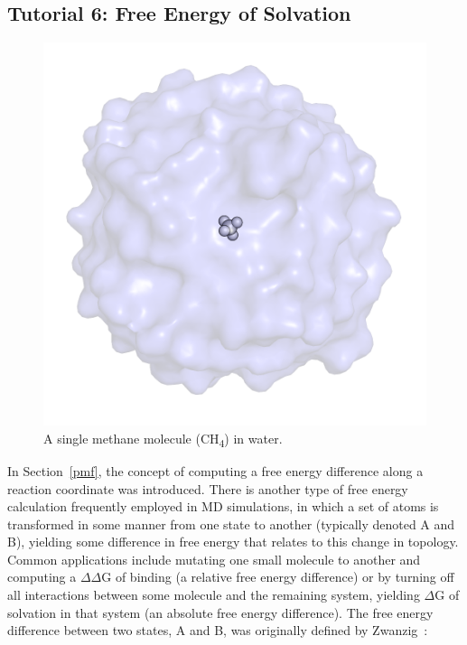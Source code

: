 \documentclass[9pt,tutorial]{livecoms}
\begin{document}
\subsection{Tutorial 6: Free Energy of Solvation} \label{fes}

\begin{figure}[H]
\centering
\includegraphics{free_energy_methane_water}
\caption{A single methane molecule (CH\textsubscript{4}) in water.}
\label{free_energy_methane_water_fig}
\end{figure}

In Section~\ref{pmf}, the concept of computing a free energy difference along a reaction coordinate was introduced. There is another type of free energy calculation frequently employed in MD simulations, in which a set of atoms is transformed in some manner from one state to another (typically denoted A and B), yielding some difference in free energy that relates to this change in topology. Common applications include mutating one small molecule to another and computing a $\Delta\Delta$G of binding (a relative free energy difference) or by turning off all interactions between some molecule and the remaining system, yielding $\Delta$G of solvation in that system (an absolute free energy difference). The free energy difference between two states, A and B, was originally defined by Zwanzig~\cite{Zwanzig1954}:
\end{document}
